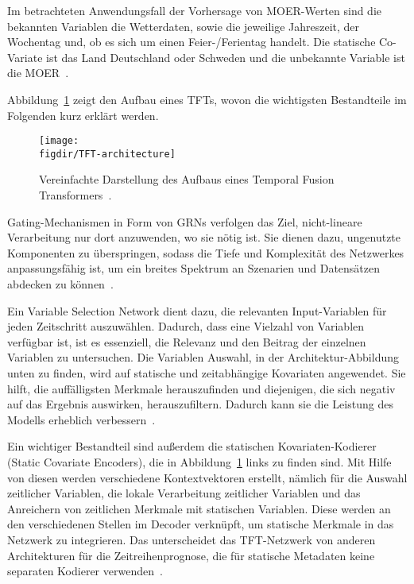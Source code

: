 Im betrachteten Anwendungsfall der Vorhersage von \ac{MOER}-Werten sind die bekannten Variablen die Wetterdaten, sowie die jeweilige Jahreszeit, der Wochentag und, ob es sich um einen Feier-/Ferientag handelt.
Die statische Co-Variate ist das Land Deutschland oder Schweden und die unbekannte Variable ist die \ac{MOER}~\cite{Labiadh.2023}.

Abbildung~\ref{FIG:tft-architecture} zeigt den Aufbau eines \ac{TFT}s, wovon die wichtigsten Bestandteile im Folgenden kurz erklärt werden.
\begin{figure}
 \caption{Vereinfachte Darstellung des Aufbaus eines Temporal Fusion Transformers~\cite{Labiadh.2023}.}
 {\texttt{[image: \\figdir/TFT-architecture]}}
 \label{FIG:tft-architecture}
\end{figure}

Gating-Mechanismen in Form von \ac{GRN}s verfolgen das Ziel, nicht-lineare Verarbeitung nur dort anzuwenden, wo sie nötig ist.
Sie dienen dazu, ungenutzte Komponenten zu überspringen, sodass die Tiefe und Komplexität des Netzwerkes anpassungsfähig ist, um ein breites Spektrum an Szenarien und Datensätzen abdecken zu können~\cite{Lim.19.12.2019}.

Ein Variable Selection Network dient dazu, die relevanten Input-Variablen für jeden Zeitschritt auszuwählen.
Dadurch, dass eine Vielzahl von Variablen verfügbar ist, ist es essenziell, die Relevanz und den Beitrag der einzelnen Variablen zu untersuchen.
Die Variablen Auswahl, in der Architektur-Abbildung unten zu finden, wird auf statische und zeitabhängige Kovariaten angewendet.
Sie hilft, die auffälligsten Merkmale herauszufinden und diejenigen, die sich negativ auf das Ergebnis auswirken, herauszufiltern.
Dadurch kann sie die Leistung des Modells erheblich verbessern~\cite{Lim.19.12.2019}.

Ein wichtiger Bestandteil sind außerdem die statischen Kovariaten-Kodierer (Static Covariate Encoders), die in Abbildung~\ref{FIG:tft-architecture} links zu finden sind.
Mit Hilfe von diesen werden verschiedene Kontextvektoren erstellt, nämlich für die Auswahl zeitlicher Variablen, die lokale Verarbeitung zeitlicher Variablen und das Anreichern von zeitlichen Merkmale mit statischen Variablen.
Diese werden an den verschiedenen Stellen im Decoder verknüpft, um statische Merkmale in das Netzwerk zu integrieren.
Das unterscheidet das \ac{TFT}-Netzwerk von anderen Architekturen für die Zeitreihenprognose, die für statische Metadaten keine separaten Kodierer verwenden~\cite{Lim.19.12.2019, Labiadh.2023}.

